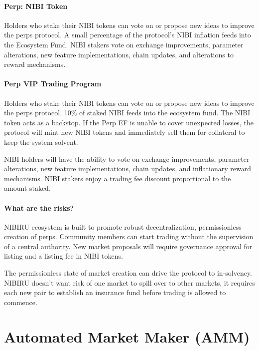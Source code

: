 \documentclass[11pt]{article}
\begin{document}
\subsection*{Perp: NIBI Token}
Holders who stake their NIBI tokens can vote on or propose new ideas to improve the perps protocol.  A small percentage of the protocol's NIBI inflation feeds into the Ecosystem Fund. NIBI stakers vote on exchange improvements, parameter alterations, new feature implementations, chain updates, and alterations to reward mechanisms.

\subsection*{Perp VIP Trading Program}

Holders who stake their NIBI tokens can vote on or propose new ideas to improve the perps protocol. 10\% of staked NIBI feeds into the ecosystem fund. The NIBI token acts as a backstop. If the Perp EF is unable to cover unexpected losses, the protocol will mint new NIBI tokens and immediately sell them for collateral to keep the system solvent.

NIBI holders will have the ability to vote on exchange improvements, parameter alterations, new feature implementations, chain updates, and inflationary reward mechanisms. NIBI stakers enjoy a trading fee discount proportional to the amount staked.


\subsection{What are the risks?}

NIBIRU ecosystem is built to promote robust decentralization, permissionless creation of perps. Community members can start trading without the supervision of a central authority. New market proposals will require governance approval for listing and a listing fee in NIBI tokens. 

The permissionless state of market creation can drive the protocol to in-solvency. NIBIRU doesn’t want risk of one market to spill over to other markets, it requires each new pair to establish an insurance fund before trading is allowed to commence.


\part{Automated Market Maker (AMM)}
\end{document}
